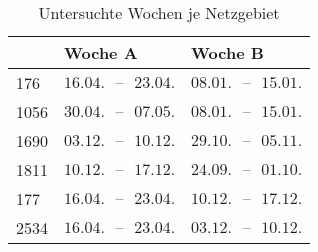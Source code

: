 {
\renewcommand{\arraystretch}{1.2}%
\begin{table}[H]
	\begin{center}
		\caption{Untersuchte Wochen je Netzgebiet}
		\begin{tabu} to 0.6\textwidth {X[0.5] X[1, r] X[1, r]}
			\toprule
					   & Woche A                         & Woche B                         \\ \midrule
			\num{176}  & \(16.04. \text{ {--} } 23.04.\) & \(08.01. \text{ {--} } 15.01.\) \\
			\num{1056} & \(30.04. \text{ {--} } 07.05.\) & \(08.01. \text{ {--} } 15.01.\) \\
			\num{1690} & \(03.12. \text{ {--} } 10.12.\) & \(29.10. \text{ {--} } 05.11.\) \\
			\num{1811} & \(10.12. \text{ {--} } 17.12.\) & \(24.09. \text{ {--} } 01.10.\) \\
			\num{177}  & \(16.04. \text{ {--} } 23.04.\) & \(10.12. \text{ {--} } 17.12.\) \\
			\num{2534} & \(16.04. \text{ {--} } 23.04.\) & \(03.12. \text{ {--} } 10.12.\) \\ \bottomrule
		\end{tabu}
		\label{tab:extreme_weeks}
	\end{center}
	\vspace{-3mm}%
\end{table}
}